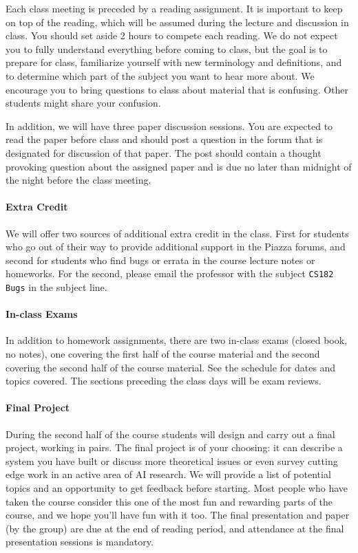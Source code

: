 \documentclass[11pt]{article}
\begin{document}
Each class meeting is preceded by a reading assignment. It is
important to keep on top of the reading, which will be assumed during
the lecture and discussion in class. You should set aside 2 hours to
compete each reading. We do not expect you to fully understand
everything before coming to class, but the goal is to prepare for
class, familiarize yourself with new terminology and definitions, and
to determine which part of the subject you want to hear more about.
We encourage you to bring questions to class about material that is
confusing.  Other students might share your confusion.

In addition, we will have three paper discussion sessions. You are
expected to read the paper before class and should post a question in
the forum that is designated for discussion of that paper. The post
should contain a thought provoking question about the assigned paper
and is due no later than midnight of the night before the class
meeting.

\paragraph{Extra Credit}

We will offer two sources of additional extra credit in the class.
First for students who go out of their way to provide additional
support in the Piazza forums, and second for students who find bugs or
errata in the course lecture notes or homeworks. For the second,
please email the professor with the subject \texttt{CS182 Bugs} in the
subject line.


\paragraph{In-class Exams}

In addition to homework assignments, there are two in-class exams
(closed book, no notes), one covering the first half of the course
material and the second covering the second half of the course
material. See the schedule for dates and topics covered. The sections
preceding the class days will be exam reviews.

\paragraph{Final Project}

During the second half of the course students will design and carry
out a final project, working in pairs. The final project is of your
choosing: it can describe a system you have built or discuss more
theoretical issues or even survey cutting edge work in an active area
of AI research. We will provide a list of potential topics and an
opportunity to get feedback before starting. Most people who have
taken the course consider this one of the most fun and rewarding parts
of the course, and we hope you'll have fun with it too. The final
presentation and paper (by the group) are due at the end of reading
period, and attendance at the final presentation sessions is
mandatory.
\end{document}
